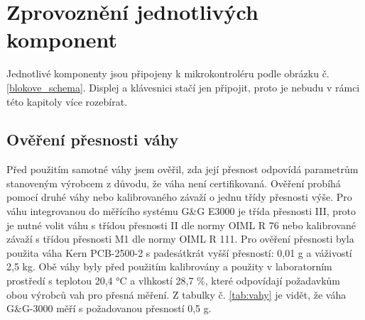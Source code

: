 \chapter{Zprovoznění jednotlivých komponent}
\label{Zprovoznění jednotlivých komponent}
Jednotlivé komponenty jsou připojeny k mikrokontroléru podle obrázku č. \ref{blokove_schema}. Displej a klávesnici stačí jen připojit, proto je nebudu v rámci této kapitoly více rozebírat.

\section{Ověření přesnosti váhy}

Před použitím samotné váhy jsem ověřil, zda její přesnost odpovídá parametrům stanoveným výrobcem z důvodu, že váha není certifikovaná. Ověření probíhá pomocí druhé váhy nebo kalibrovaného závaží o jednu třídy přesnosti výše. Pro váhu integrovanou do měřícího systému G\&G E3000 je třída přesnosti III, proto je nutné volit váhu s třídou přesnosti II dle normy OIML R 76 nebo kalibrované závaží s třídou přesnosti M1 dle normy OIML R 111. Pro ověření přesnosti byla použita váha Kern PCB-2500-2 s padesátkrát vyšší přesností: 0,01 g a váživostí 2,5 kg. Obě váhy byly před použitím kalibrovány a použity v laboratorním prostředí s teplotou 20,4 °C a vlhkostí 28,7 \%, které odpovídají požadavkům obou výrobců vah pro přesná měření. Z tabulky č. \ref{tab:vahy} je vidět, že váha G\&G-3000 měří s požadovanou přesností 0,5 g. %






